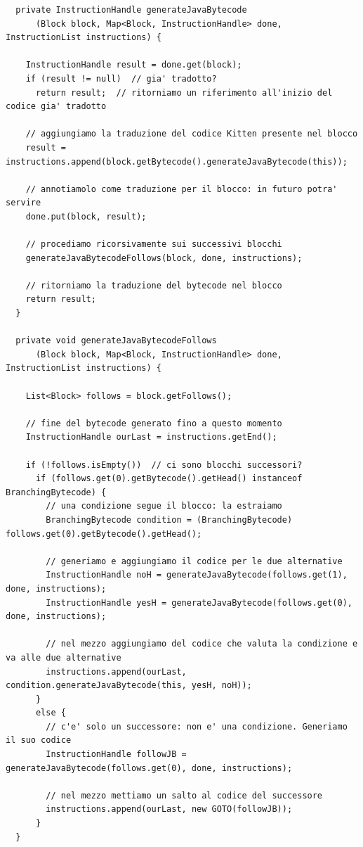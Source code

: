 {\scriptsize
\begin{verbatim}
  private InstructionHandle generateJavaBytecode
      (Block block, Map<Block, InstructionHandle> done, InstructionList instructions) {
 
    InstructionHandle result = done.get(block);
    if (result != null)  // gia' tradotto?
      return result;  // ritorniamo un riferimento all'inizio del codice gia' tradotto

    // aggiungiamo la traduzione del codice Kitten presente nel blocco
    result = instructions.append(block.getBytecode().generateJavaBytecode(this));

    // annotiamolo come traduzione per il blocco: in futuro potra' servire
    done.put(block, result);

    // procediamo ricorsivamente sui successivi blocchi
    generateJavaBytecodeFollows(block, done, instructions);

    // ritorniamo la traduzione del bytecode nel blocco
    return result;
  }

  private void generateJavaBytecodeFollows
      (Block block, Map<Block, InstructionHandle> done, InstructionList instructions) {

    List<Block> follows = block.getFollows();

    // fine del bytecode generato fino a questo momento
    InstructionHandle ourLast = instructions.getEnd();

    if (!follows.isEmpty())  // ci sono blocchi successori?
      if (follows.get(0).getBytecode().getHead() instanceof BranchingBytecode) {
        // una condizione segue il blocco: la estraiamo
        BranchingBytecode condition = (BranchingBytecode) follows.get(0).getBytecode().getHead();

        // generiamo e aggiungiamo il codice per le due alternative
        InstructionHandle noH = generateJavaBytecode(follows.get(1), done, instructions);
        InstructionHandle yesH = generateJavaBytecode(follows.get(0), done, instructions);

        // nel mezzo aggiungiamo del codice che valuta la condizione e va alle due alternative
        instructions.append(ourLast, condition.generateJavaBytecode(this, yesH, noH));
      }
      else {
        // c'e' solo un successore: non e' una condizione. Generiamo il suo codice
        InstructionHandle followJB = generateJavaBytecode(follows.get(0), done, instructions);

        // nel mezzo mettiamo un salto al codice del successore
        instructions.append(ourLast, new GOTO(followJB));
      }
  }
\end{verbatim}}

